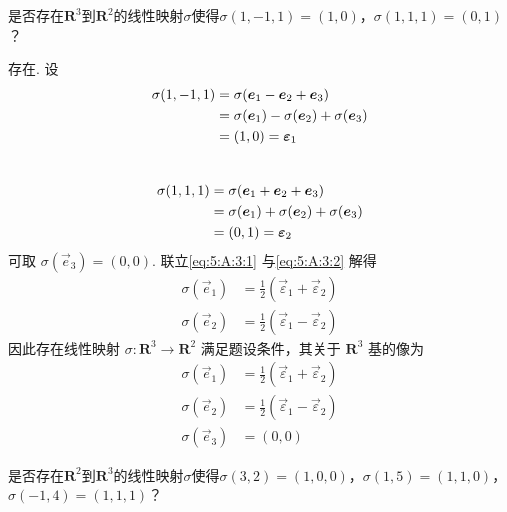 \begin{exercise}
\begin{exgroup}
        \item 是否存在$\mathbf{R}^3$到$\mathbf{R}^2$的线性映射$\sigma$使得$\sigma(1,-1,1)=(1,0)$，$\sigma(1,1,1)=(0,1)$？

        \begin{answer}
            存在. 设
          \begin{align}
              \sigma(1, -1, 1) & = \sigma(\vec{e}_1 - \vec{e}_2 + \vec{e}_3) \notag                 \\
                               & = \sigma(\vec{e}_1) - \sigma(\vec{e}_2) + \sigma(\vec{e}_3) \notag \\
                               & = (1, 0) = \vec{\varepsilon}_1 \label{eq:5:A:3:1}
          \end{align} \\
          \begin{align}
              \sigma(1, 1, 1) & = \sigma(\vec{e}_1 + \vec{e}_2 + \vec{e}_3) \notag                 \\
                              & = \sigma(\vec{e}_1) + \sigma(\vec{e}_2) + \sigma(\vec{e}_3) \notag \\
                              & = (0, 1) = \vec{\varepsilon}_2 \label{eq:5:A:3:2}
          \end{align}
          可取 $ \sigma(\vec{e}_3) = (0, 0) $. 联立\autoref{eq:5:A:3:1} 与\autoref{eq:5:A:3:2} 解得
          \begin{align*}
              \sigma(\vec{e}_1) & = \frac{1}{2} (\vec{\varepsilon}_1 + \vec{\varepsilon}_2) \\
              \sigma(\vec{e}_2) & = \frac{1}{2} (\vec{\varepsilon}_1 - \vec{\varepsilon}_2)
          \end{align*}
          因此存在线性映射 $ \sigma : \mathbf{R}^3 \to \mathbf{R}^2 $ 满足题设条件，其关于 $ \mathbf{R}^3 $ 基的像为
          \begin{align*}
              \sigma(\vec{e}_1) & = \frac{1}{2} (\vec{\varepsilon}_1 + \vec{\varepsilon}_2) \\
              \sigma(\vec{e}_2) & = \frac{1}{2} (\vec{\varepsilon}_1 - \vec{\varepsilon}_2) \\
              \sigma(\vec{e}_3) & = (0, 0)
          \end{align*}

        \end{answer}

        \item 是否存在$\mathbf{R}^2$到$\mathbf{R}^3$的线性映射$\sigma$使得$\sigma(3,2)=(1,0,0)$，$\sigma(1,5)=(1,1,0)$，$\sigma(-1,4)=(1,1,1)$？


\end{exgroup}
\end{exercise}
